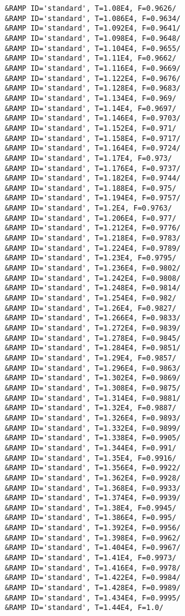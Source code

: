 \begin{lstlisting}
&RAMP ID='standard', T=1.08E4, F=0.9626/
&RAMP ID='standard', T=1.086E4, F=0.9634/
&RAMP ID='standard', T=1.092E4, F=0.9641/
&RAMP ID='standard', T=1.098E4, F=0.9648/
&RAMP ID='standard', T=1.104E4, F=0.9655/
&RAMP ID='standard', T=1.11E4, F=0.9662/
&RAMP ID='standard', T=1.116E4, F=0.9669/
&RAMP ID='standard', T=1.122E4, F=0.9676/
&RAMP ID='standard', T=1.128E4, F=0.9683/
&RAMP ID='standard', T=1.134E4, F=0.969/
&RAMP ID='standard', T=1.14E4, F=0.9697/
&RAMP ID='standard', T=1.146E4, F=0.9703/
&RAMP ID='standard', T=1.152E4, F=0.971/
&RAMP ID='standard', T=1.158E4, F=0.9717/
&RAMP ID='standard', T=1.164E4, F=0.9724/
&RAMP ID='standard', T=1.17E4, F=0.973/
&RAMP ID='standard', T=1.176E4, F=0.9737/
&RAMP ID='standard', T=1.182E4, F=0.9744/
&RAMP ID='standard', T=1.188E4, F=0.975/
&RAMP ID='standard', T=1.194E4, F=0.9757/
&RAMP ID='standard', T=1.2E4, F=0.9763/
&RAMP ID='standard', T=1.206E4, F=0.977/
&RAMP ID='standard', T=1.212E4, F=0.9776/
&RAMP ID='standard', T=1.218E4, F=0.9783/
&RAMP ID='standard', T=1.224E4, F=0.9789/
&RAMP ID='standard', T=1.23E4, F=0.9795/
&RAMP ID='standard', T=1.236E4, F=0.9802/
&RAMP ID='standard', T=1.242E4, F=0.9808/
&RAMP ID='standard', T=1.248E4, F=0.9814/
&RAMP ID='standard', T=1.254E4, F=0.982/
&RAMP ID='standard', T=1.26E4, F=0.9827/
&RAMP ID='standard', T=1.266E4, F=0.9833/
&RAMP ID='standard', T=1.272E4, F=0.9839/
&RAMP ID='standard', T=1.278E4, F=0.9845/
&RAMP ID='standard', T=1.284E4, F=0.9851/
&RAMP ID='standard', T=1.29E4, F=0.9857/
&RAMP ID='standard', T=1.296E4, F=0.9863/
&RAMP ID='standard', T=1.302E4, F=0.9869/
&RAMP ID='standard', T=1.308E4, F=0.9875/
&RAMP ID='standard', T=1.314E4, F=0.9881/
&RAMP ID='standard', T=1.32E4, F=0.9887/
&RAMP ID='standard', T=1.326E4, F=0.9893/
&RAMP ID='standard', T=1.332E4, F=0.9899/
&RAMP ID='standard', T=1.338E4, F=0.9905/
&RAMP ID='standard', T=1.344E4, F=0.991/
&RAMP ID='standard', T=1.35E4, F=0.9916/
&RAMP ID='standard', T=1.356E4, F=0.9922/
&RAMP ID='standard', T=1.362E4, F=0.9928/
&RAMP ID='standard', T=1.368E4, F=0.9933/
&RAMP ID='standard', T=1.374E4, F=0.9939/
&RAMP ID='standard', T=1.38E4, F=0.9945/
&RAMP ID='standard', T=1.386E4, F=0.995/
&RAMP ID='standard', T=1.392E4, F=0.9956/
&RAMP ID='standard', T=1.398E4, F=0.9962/
&RAMP ID='standard', T=1.404E4, F=0.9967/
&RAMP ID='standard', T=1.41E4, F=0.9973/
&RAMP ID='standard', T=1.416E4, F=0.9978/
&RAMP ID='standard', T=1.422E4, F=0.9984/
&RAMP ID='standard', T=1.428E4, F=0.9989/
&RAMP ID='standard', T=1.434E4, F=0.9995/
&RAMP ID='standard', T=1.44E4, F=1.0/



\end{lstlisting}

